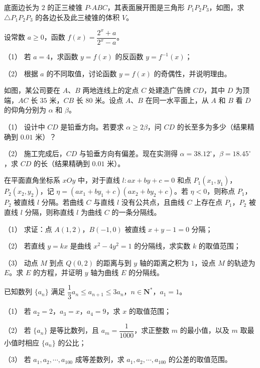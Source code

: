 \Needspace{0.4\textheight}
\begin{question}
底面边长为 $2$ 的正三棱锥 $P\text{-}ABC$，其表面展开图是三角形 $P_1P_2P_3$，如图，求 $\triangle P_1P_2P_3$ 的各边长及此三棱锥的体积 $V$。
\nopagebreak[4]
\begin{center}\end{center}
\nopagebreak[4]
\end{question}
\begin{question}
设常数 $a\geqslant0$，函数 $f(x)=\dfrac{2^x+a}{2^x-a}$。

（1） 若 $a=4$，求函数 $y=f(x)$ 的反函数 $y=f^{-1}(x)$；

（2） 根据 $a$ 的不同取值，讨论函数 $y=f(x)$ 的奇偶性，并说明理由。

\Needspace{0.4\textheight}
\end{question}
\begin{question}
如图，某公司要在 $A$、$B$ 两地连线上的定点 $C$ 处建造广告牌 $CD$，其中 $D$ 为顶端，$AC$ 长 $35$ 米，$CB$ 长 $80$ 米。设点 $A$、$B$ 在同一水平面上，从 $A$ 和 $B$ 看 $D$ 的仰角分别为 $\alpha$ 和 $\beta$。
\nopagebreak[4]
\begin{center}\end{center}
\nopagebreak[4]
（1） 设计中 $CD$ 是铅垂方向。若要求 $\alpha\geqslant2\beta$，问 $CD$ 的长至多为多少（结果精确到 $0.01$ 米）？

（2） 施工完成后，$CD$ 与铅垂方向有偏差。现在实测得 $\alpha=38.12^\circ$，$\beta=18.45^\circ$，求 $CD$ 的长（结果精确到 $0.01$ 米）。

\end{question}
\begin{question}
在平面直角坐标系 $xOy$ 中，对于直线 $l:ax+by+c=0$ 和点 $P_1(x_1,y_1)$，$P_2(x_2,y_2)$，记 $\eta=(ax_1+by_1+c)(ax_2+by_2+c)$。若 $\eta<0$，则称点 $P_1$，$P_2$ 被直线 $l$ 分隔。若曲线 $C$ 与直线 $l$ 没有公共点，且曲线 $C$ 上存在点 $P_1$，$P_2$ 被直线 $l$ 分隔，则称直线 $l$ 为曲线 $C$ 的一条分隔线。

（1） 求证：点 $A(1,2)$，$B(-1,0)$ 被直线 $x+y-1=0$ 分隔；

（2） 若直线 $y=kx$ 是曲线 $x^2-4y^2=1$ 的分隔线，求实数 $k$ 的取值范围；

（3） 动点 $M$ 到点 $Q(0,2)$ 的距离与到 $y$ 轴的距离之积为 $1$，设点 $M$ 的轨迹为 $E$。求 $E$ 的方程，并证明 $y$ 轴为曲线 $E$ 的分隔线。

\end{question}
\begin{question}
已知数列 $\{a_n\}$ 满足 $\dfrac13a_n\leqslant a_{n+1}\leqslant3a_n$，$n\in\mathbf N^*$，$a_1=1$。

（1） 若 $a_2=2$，$a_3=x$，$a_4=9$，求 $x$ 的取值范围；

（2） 若 $\{a_n\}$ 是等比数列，且 $a_m=\dfrac1{1000}$，求正整数 $m$ 的最小值，以及 $m$ 取最小值时相应 $\{a_n\}$ 的公比；

（3） 若 $a_1,a_2,\cdots,a_{100}$ 成等差数列，求 $a_1,a_2,\cdots,a_{100}$ 的公差的取值范围。

\end{question}